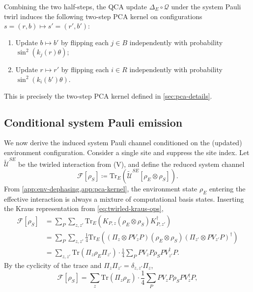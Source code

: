 \documentclass[
    aps,
    prx,
    reprint,
    superscriptaddress,
    longbibliography,
    nofootinbib,
    floatfix,
]{revtex4-2}
\newcommand{\Tr}{\mathrm{Tr}}
\begin{document}
Combining the two half-steps, the QCA update \(\Delta_E \circ \mathcal{Q}\) under the system Pauli twirl induces the following two-step PCA kernel on configurations \(s = (r,b) \mapsto s'= (r',b')\):
\begin{enumerate}
    \item Update \(b \mapsto b'\) by flipping each \(j \in B\) independently with probability \(\sin^2(k_j(r) \theta)\);
    \item Update \(r \mapsto r'\) by flipping each \(i \in R\) independently with probability \(\sin^2(k_i(b') \theta)\).
\end{enumerate}
This is precisely the two-step PCA kernel defined in \cref{sec:pca-details}.

\subsection{Conditional system Pauli emission}\label{app:system-pauli-emission}
We now derive the induced system Pauli channel conditioned on the (updated) environment configuration. Consider a single site and suppress the site index. Let \(\widetilde{\mathcal{U}}^{SE}\) be the twirled interaction from (V), and define the reduced system channel
\begin{equation}
    \mathcal{F}[\rho_S] \coloneq \Tr_E(\widetilde{\mathcal{U}}^{SE}[\rho_E \otimes \rho_S]).
\end{equation}
From \cref{app:env-dephasing,app:pca-kernel}, the environment state \(\rho_E\) entering the effective interaction is always a mixture of computational basis states. Inserting the Kraus representation from \cref{eq:twirled-kraus-ops},
\begin{equation}
    \begin{split}
        \mathcal{F}[\rho_S]
        &= \sum_P \sum_{z,z'} \Tr_E(K_{P,z} (\rho_E \otimes \rho_S) K_{P,z'}^\dagger) \\
        &= \sum_P \sum_{z,z'} \frac{1}{4} \Tr_E((\Pi_z \otimes PV_zP) (\rho_E \otimes \rho_S) (\Pi_{z'} \otimes PV_{z'}P)^\dagger) \\
        &= \sum_{z,z'} \Tr(\Pi_z \rho_E \Pi_{z'}) \cdot \frac{1}{4} \sum_P P V_z P \rho_S P V_{z'}^\dagger P.
    \end{split}
\end{equation}
By the cyclicity of the trace and \(\Pi_z\Pi_{z'} = \delta_{z,z'} \Pi_z\),
\begin{equation}
    \mathcal{F}[\rho_S] = \sum_z \Tr(\Pi_z \rho_E) \cdot \frac{1}{4} \sum_P P V_z P \rho_S P V_z^\dagger P,
\end{equation}
\end{document}
